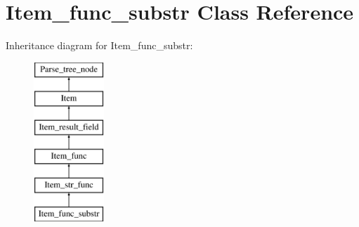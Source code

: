 \hypertarget{classItem__func__substr}{}\section{Item\+\_\+func\+\_\+substr Class Reference}
\label{classItem__func__substr}
Inheritance diagram for Item\+\_\+func\+\_\+substr\+:\begin{figure}[H]
\begin{center}
\leavevmode
\includegraphics[height=6.000000cm]{classItem__func__substr}
\end{center}
\end{figure}
